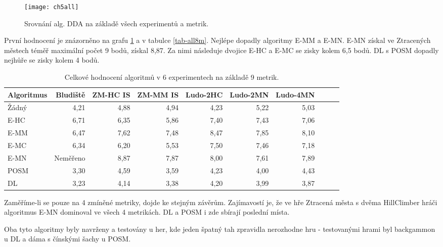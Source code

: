 \begin{figure}
  \centering
  \texttt{[image: ch5all]}
	\caption{ Srovnání alg. DDA na základě všech experimentů a metrik. }
	\label{fig-ch5all}
\end{figure}

První hodnocení je znázorněno na grafu \ref{fig-ch5all} a v tabulce \ref{tab-all8m}. Nejlépe dopadly algoritmy E-MM a E-MN. E-MN získal ve Ztracených městech téměř maximální počet 9 bodů, získal 8,87. Za nimi následuje dvojice E-HC a E-MC se zisky kolem 6,5 bodů. DL s POSM dopadly nejhůře se zisky kolem 4 bodů.

\begin{table*}[b]\footnotesize
\vspace*{0mm}
\caption{{\label{tab-all8m}} Celkové hodnocení algoritmů v 6 experimentech na základě 9 metrik.}
\vspace*{0mm}
\label{shadowtable}
\begin{center}
\begin{tabular}{| l || r | r | r | r | r | r | r | r | r |}
\hline
Algoritmus & Bludiště & ZM-HC IS & ZM-MM IS & Ludo-2HC & Ludo-2MN & Ludo-4MN \\
\hline
\hline
Žádný & 4,21 & 4,88 & 4,94 & 4,23 & 5,22 & 5,03\\ \hline  
E-HC & 6,71 & 6,35 & 5,86 & 7,40 & 7,43 & 7,06\\ \hline  
E-MM & 6,47 & 7,62 & 7,48 & 8,47 & 7,85 & 8,10\\ \hline  
E-MC & 6,34 & 6,20 & 5,53 & 7,50 & 7,46 & 7,18\\ \hline  
E-MN & Neměřeno & 8,87 & 7,87 & 8,00 & 7,61 & 7,89\\ \hline  
POSM & 3,30 & 4,59 & 3,59 & 4,23 & 4,00 & 4,43\\ \hline  
DL & 3,23 & 4,14 & 3,38 & 4,20 & 3,99 & 3,87\\ \hline  
\end{tabular}
\end{center}
\end{table*}

Zaměříme-li se pouze na 4 zmíněné metriky, dojde ke stejným závěrům. Zajímavostí je, že ve hře Ztracená města s dvěma HillClimber hráči algoritmus E-MN dominoval ve všech 4 metrikách. DL a POSM i zde sbírají poslední místa.

Oba tyto algoritmy byly navrženy a testovány u her, kde jeden špatný tah zpravidla nerozhodne hru - testovanými hrami byl backgammon u DL a dáma s čínskými šachy u POSM.

